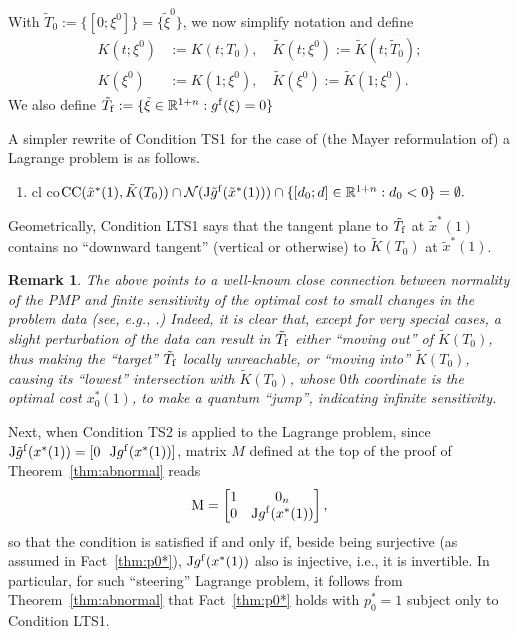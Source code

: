 \documentclass[letterpaper,10pt,conference]{ieeeconf}
\def\R{{\mathbb{R}}}
\newtheorem{remark}{Remark} %
\begin{document}
With $\tilde T_0:=\{[0;\xi^0]\}=\{\tilde \xi^0\}$, we now
simplify notation and define
\[
\begin{aligned}
K(t;\xi^0)&:=K(t;T_0), \quad \tilde K(t;\xi^0):=\tilde K(t;\tilde T_0);\\
K(\xi^0)&:=K(1;\xi^0), \quad \tilde K(\xi^0):=\tilde K(1;\xi^0).
\end{aligned}
\]
We also define $\tilde T_{\rm f}:=\{\tilde \xi\in\R^{1+n}:g^{\rm f}(\xi)=0\}$

A simpler rewrite of Condition TS1
for the case of (the Mayer reformulation of) a Lagrange problem
is as follows.
\begin{enumerate}
\item[LTS1.] cl co${\rm CC}(\tilde x^*(1),\tilde K(T_0))
\cap{\mathcal N}({\rm J}\tilde g^{\rm f}(\tilde x^*(1)))
\cap\{[d_0;d]\in\R^{1+n}:d_0<0\}=\emptyset.$
\end{enumerate}
Geometrically, Condition LTS1 says that the tangent plane to
$\tilde T_{\rm f}$ at $\tilde x^*(1)$ contains no ``downward tangent'' 
(vertical or otherwise) to $\tilde K(T_0)$ at $\tilde x^*(1)$.
\begin{remark}
The above points to a well-known close connection between 
normality of the PMP and finite sensitivity
of the optimal cost to small changes in the problem data (see, e.g.,
\cite{Babad1991,BabadVinter1993}.)  Indeed, it is
clear that, except for very special cases, a slight perturbation
of the data can result in $\tilde T_{\rm f}$ either ``moving out'' of
$\tilde K(T_0)$, thus making the ``target'' $\tilde T_{\rm f}$ locally
unreachable, or ``moving into''
$\tilde K(T_0)$, causing its ``lowest'' intersection with $\tilde K(T_0)$,
whose $0$th coordinate is the optimal cost $x_0^*(1)$, to make a quantum
``jump'', indicating infinite sensitivity.
\end{remark}

Next, when Condition TS2 is applied to the Lagrange problem, 
since ${\rm J}\tilde g^{\rm f}(x^*(1))=[0~~{\rm J}g^{\rm f}(x^*(1))]$,
matrix $M$ defined at the top of the proof of Theorem~\ref{thm:abnormal}
reads
\begin{equation}
\label{eq:M}
{\rm M}
= \begin{bmatrix} 1 & 0_n \\ 0 & {\rm J}g^{\rm f}(x^*(1)) \end{bmatrix},
\end{equation}
so that the condition is satisfied if and only if, beside being surjective (as
assumed in Fact~\ref{thm:p0*}), ${\rm J}g^{\rm f}(x^*(1))$ also is 
injective, i.e., it is invertible.
In particular, for such ``steering'' Lagrange problem, it follows from
Theorem~\ref{thm:abnormal} that
Fact~\ref{thm:p0*} holds with $p_0^*=1$ subject only to Condition LTS1.
\end{document}

